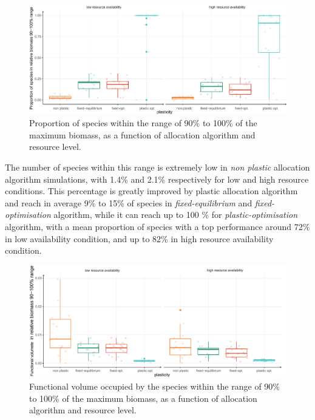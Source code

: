 \begin{figure}
\includegraphics[width = \textwidth]{./2_PP/Figures/Landscape/plot_eveness.pdf}
\caption{Proportion of species within the range of 90\% to 100\% of the maximum biomass, as a function of allocation algorithm and resource level.}\label{fig:species_richness}
\end{figure}

The number of species within this range is extremely low in \textit{non plastic} allocation algorithm simulations, with 1.4\% and 2.1\% respectively for low and high resource conditions. This percentage is greatly improved by plastic allocation algorithm and reach in average 9\% to 15\% of species in \textit{fixed-equilibrium} and \textit{fixed-optimisation} algorithm, while it can reach up to 100 \% for \textit{plastic-optimisation} algorithm, with a mean proportion of species with a top performance around 72\% in low availability condition, and up to 82\% in high resource availability condition.

\begin{figure}
\includegraphics[width = \textwidth]{./2_PP/Figures/Landscape/plot_fdiv.pdf}
\caption{Functional volume occupied by the species within the range of 90\% to 100\% of the maximum biomass, as a function of allocation algorithm and resource level.}\label{fig:function_div}
\end{figure}

